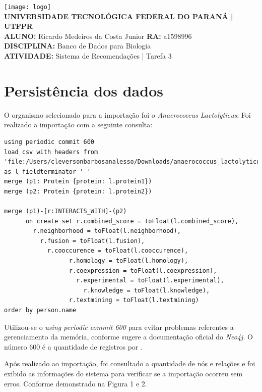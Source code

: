 \documentclass[a4paper, 12pt]{article}
\begin{document}
\lstset{language=SQL}
\begin{flushleft}\texttt{[image: logo]}\\
\textbf{UNIVERSIDADE TECNOLÓGICA FEDERAL DO PARANÁ | UTFPR} \\
\textbf{ALUNO:} Ricardo Medeiros da Costa Junior   \textbf{RA:} a1598996 \\
\textbf{DISCIPLINA:} Banco de Dados para Biologia \\
\textbf{ATIVIDADE:} Sistema de Recomendações | Tarefa 3 

\section{Persistência dos dados}
O organismo selecionado para a importação foi o \emph{Anaerococcus Lactolyticus}. Foi realizado a importação com a seguinte consulta:

\begin{lstlisting}[frame=single]
using periodic commit 600
load csv with headers from 'file:/Users/cleversonbarbosanalesso/Downloads/anaerococcus_lactolyticus.csv' as l fieldterminator ' '
merge (p1: Protein {protein: l.protein1})
merge (p2: Protein {protein: l.protein2})

merge (p1)-[r:INTERACTS_WITH]-(p2)
      on create set r.combined_score = toFloat(l.combined_score),
        r.neighborhood = toFloat(l.neighborhood),
          r.fusion = toFloat(l.fusion),
            r.cooccurence = toFloat(l.cooccurence),
                  r.homology = toFloat(l.homology),
                  r.coexpression = toFloat(l.coexpression),
                    r.experimental = toFloat(l.experimental),
                      r.knowledge = toFloat(l.knowledge),
                  r.textmining = toFloat(l.textmining)
order by person.name
\end{lstlisting}

Utilizou-se o \emph{using periodic commit 600} para evitar problemas referentes a gerenciamento da memória, conforme sugere a documentação oficial do \emph{Neo4j}. O número 600 é a quantidade de registros por .

Após realizado ao importação, foi consultado a quantidade de nós e relações e foi exibido as informações do sistema para verificar se a importação ocorreu sem erros. Conforme demonstrado na Figura 1 e 2.


\end{flushleft}
\end{document}
